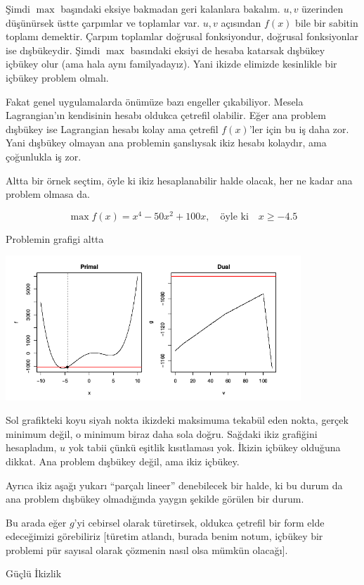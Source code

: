 \documentclass[12pt,fleqn]{article}\usepackage{../../common}
\begin{document}
Şimdi $\max$ başındaki eksiye bakmadan geri kalanlara bakalım. $u,v$
üzerinden düşünürsek üstte çarpımlar ve toplamlar var. $u,v$ açısından
$f(x)$ bile bir sabitin toplamı demektir. Çarpım toplamlar doğrusal
fonksiyondur, doğrusal fonksiyonlar ise dışbükeydir. Şimdi $\max$ basındaki
eksiyi de hesaba katarsak dışbükey içbükey olur (ama hala aynı
familyadayız). Yani ikizde elimizde kesinlikle bir içbükey problem olmalı.

Fakat genel uygulamalarda önümüze bazı engeller çıkabiliyor. Mesela
Lagrangian'ın kendisinin hesabı oldukca çetrefil olabilir. Eğer ana problem
dışbükey ise Lagrangian hesabı kolay ama çetrefil $f(x)$'ler için bu iş
daha zor. Yani dışbükey olmayan ana problemin şanslıysak ikiz hesabı
kolaydır, ama çoğunlukla iş zor. 

Altta bir örnek seçtim, öyle ki ikiz hesaplanabilir halde olacak, her ne
kadar ana problem olmasa da. 

$$
\max f(x) = x^4 - 50x^2 + 100x, \quad \textrm{öyle ki} \quad x \ge -4.5
$$

Problemin grafigi altta

\includegraphics[width=30em]{func_56_gendual_04.png}

Sol grafikteki koyu siyah nokta ikizdeki maksimuma tekabül eden nokta,
gerçek minimum değil, o minimum biraz daha sola doğru. Sağdaki ikiz
grafiğini hesapladım, $u$ yok tabii çünkü eşitlik kısıtlaması yok. İkizin
içbükey olduğuna dikkat. Ana problem dışbükey değil, ama ikiz içbükey. 

Ayrıca ikiz aşağı yukarı ``parçalı lineer'' denebilecek bir halde, ki bu
durum da ana problem dışbükey olmadığında yaygın şekilde görülen bir durum.

Bu arada eğer $g$'yi cebirsel olarak türetirsek, oldukca çetrefil bir form
elde edeceğimizi görebiliriz [türetim atlandı, burada benim notum, içbükey
bir problemi pür sayısal olarak çözmenin nasıl olsa mümkün olacağı].

Güçlü İkizlik 
\end{document}
